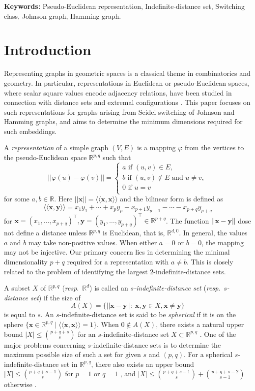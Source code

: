 \documentclass[a4paper, 11pt]{article}
\newcommand{\R}{\mathbb{R}}
\newcommand{\x}{\boldsymbol{x}}
\newcommand{\y}{\boldsymbol{y}}
\theoremstyle{definition}
\begin{document}
\bigskip

\noindent
\textbf{Keywords:} Pseudo-Euclidean representation, Indefinite-distance set, Switching class, Johnson graph, Hamming graph. 


\section{Introduction}
Representing graphs in geometric spaces is a classical theme in combinatorics and geometry. In particular, representations in Euclidean or pseudo-Euclidean spaces, where scalar square values encode adjacency relations, have been studied in connection with distance sets and extremal configurations \cite{I11,M19,N19,NS16,NS18,R10}. This paper focuses on such representations for graphs arising from Seidel switching of Johnson and Hamming graphs, and aims to determine the minimum dimensions required for such embeddings.


 A {\it representation} of a simple graph $(V,E)$ is a mapping $\varphi$ from the vertices to the pseudo-Euclidean space $\R^{p,q}$ such that
 \[
 ||\varphi(u)-\varphi(v)||=\begin{cases}
 a \text{ if $(u,v) \in E$}, \\
 b \text{ if $(u,v) \not\in E$ and $u\ne v$},\\
 0 \text{ if $u=v$}\\
 \end{cases}
 \]
 for some $a,b \in \mathbb{R}$. 
 Here $||\boldsymbol{x}||=\langle \langle \boldsymbol{x},\boldsymbol{x} \rangle \rangle$ and the bilinear form is defined as  
\[
\langle \langle \x, \y \rangle \rangle=x_1 y_1 +\cdots +x_p y_p-x_{p+1}y_{p+1}-\cdots -x_{p+q}y_{p+q}
\] 
for $\x=(x_1,\ldots,x_{p+q})^\top, \y=(y_1,\ldots,y_{p+q})^\top \in \mathbb{R}^{p+q}$. 
The function $||\boldsymbol{x} - \boldsymbol{y}||$ dose not define a distance unless $\mathbb{R}^{p,q}$ is Euclidean, that is, $\mathbb{R}^{d,0}$.  
In general, the values $a$ and $b$ may take non-positive values.  
When either $a = 0$ or $b = 0$, the mapping may not be injective.
 Our primary concern lies in determining the minimal dimensionality $p+q$ required for a representation with $a \ne b$. 
 This is closely related to the problem of identifying the largest $2$-indefinite-distance sets. 
 
 A subset $X$ of $\mathbb{R}^{p,q}$ ({\it resp}.\ $\mathbb{R}^d$) is called an {\it $s$-indefinite-distance set} ({\it resp}.\ {\it $s$-distance set}) if the size of 
 \[
A(X)=\{|| \x-\y||  \colon\, \x, \y  \in X, \x \ne \y \}
\]
is equal to $s$. 
An $s$-indefinite-distance set is said to be \emph{spherical} if it is on the sphere $\{\x \in \R^{p,q} \mid \langle \langle \x, \x \rangle \rangle =1\}$. 
When $0 \not \in A(X)$, there exists a natural upper bound $|X| \leq \binom{p+q+s}{s}$ for an $s$-indefinite-distance set $X\subset \mathbb{R}^{p,q}$ \cite{BBS83, BT, NSSpre}. 
One of the major problems concerning $s$-indefinite-distance sets is to determine the maximum possible size of such a set for given $s$ and $(p,q)$. 
For a spherical $s$-indefinite-distance set in $\mathbb{R}^{p,q}$, there also exists an upper bound $|X|\leq \binom{p+q+s-1}{s}$ for $p=1$ or $q=1$ \cite{BT}, and 
$|X| \leq \binom{p+q+s-1}{s}+\binom{p+q+s-2}{s-1}$ otherwise \cite{NSSpre}.  
\end{document}
